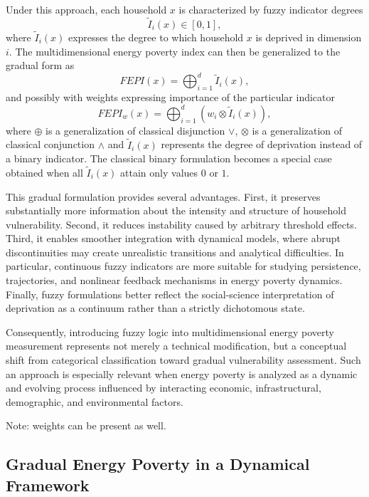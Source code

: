 \documentclass[11pt,a4paper]{article}
\begin{document}
Under this approach, each household $x$ is characterized by fuzzy indicator degrees
\[
\tilde I_{i}(x) \in [0,1],
\]
where $\tilde I_{i}(x)$ expresses the degree to which household $x$ is deprived in dimension $i$. The multidimensional energy poverty index can then be generalized to the gradual form as
\begin{equation}
\label{eq:fuzzy_mepi}
FEPI(x) = \bigoplus_{i=1}^{d} \tilde I_{i}(x),
\end{equation}
and possibly with weights expressing importance of the particular indicator
\begin{equation}
\label{eq:fuzzy_mepi}
FEPI_w(x) = \bigoplus_{i=1}^{d} (w_i\otimes \tilde I_{i}(x)),
\end{equation}
where $\oplus$ is a generalization of classical disjunction $\vee$, $\otimes$ is a generalization of classical conjunction $\wedge$ and $\tilde I_{i}(x)$ represents the degree of deprivation instead of a binary indicator. The classical binary formulation becomes a special case obtained when all $\tilde I_{i}(x)$ attain only values $0$ or $1$.

This gradual formulation provides several advantages. First, it preserves substantially more information about the intensity and structure of household vulnerability. Second, it reduces instability caused by arbitrary threshold effects. Third, it enables smoother integration with dynamical models, where abrupt discontinuities may create unrealistic transitions and analytical difficulties. In particular, continuous fuzzy indicators are more suitable for studying persistence, trajectories, and nonlinear feedback mechanisms in energy poverty dynamics. Finally, fuzzy formulations better reflect the social-science interpretation of deprivation as a continuum rather than a strictly dichotomous state.

Consequently, introducing fuzzy logic into multidimensional energy poverty measurement represents not merely a technical modification, but a conceptual shift from categorical classification toward gradual vulnerability assessment. Such an approach is especially relevant when energy poverty is analyzed as a dynamic and evolving process influenced by interacting economic, infrastructural, demographic, and environmental factors.

Note: weights can be present as well.

\subsection{Gradual Energy Poverty in a Dynamical Framework}
\end{document}
